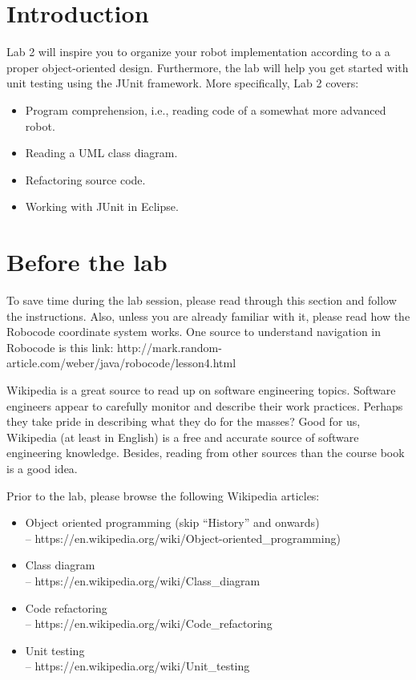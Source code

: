 \documentclass{scrreprt}
\begin{document}
\chapter{Introduction}
Lab 2 will inspire you to organize your robot implementation according to a a proper object-oriented design. Furthermore, the lab will help you get started with unit testing using the JUnit framework. More specifically, Lab 2 covers:

\begin{itemize}
\item Program comprehension, i.e., reading code of a somewhat more advanced robot.
\item Reading a UML class diagram.
\item Refactoring source code.
\item Working with JUnit in Eclipse.
\end{itemize}

\chapter{Before the lab}
To save time during the lab session, please read through this section and follow the instructions. Also, unless you are already familiar with it, please read how the Robocode coordinate system works. One source to understand navigation in Robocode is this link: http://mark.random-article.com/weber/java/robocode/lesson4.html

Wikipedia is a great source to read up on software engineering topics. Software engineers appear to carefully monitor and describe their work practices. Perhaps they take pride in describing what they do for the masses? Good for us, Wikipedia (at least in English) is a free and accurate source of software engineering knowledge. Besides, reading from other sources than the course book is a good idea.

Prior to the lab, please browse the following Wikipedia articles:
\begin{itemize}
\item Object oriented programming (skip ``History'' and onwards)\\-- https://en.wikipedia.org/wiki/Object-oriented_programming)
\item Class diagram\\-- https://en.wikipedia.org/wiki/Class_diagram
\item Code refactoring\\-- https://en.wikipedia.org/wiki/Code_refactoring
\item Unit testing\\-- https://en.wikipedia.org/wiki/Unit_testing
\end{itemize}
\end{document}
